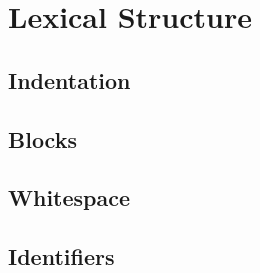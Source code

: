 \chapter{Lexical Structure}
\section{Indentation}
\section{Blocks}
\section{Whitespace}
\section{Identifiers}